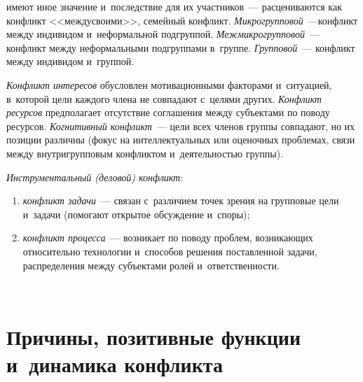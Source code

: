 \begin{multicols}{2}


\noindent
 имеют 
иное значение и~последствие для их участников~--- расцениваются как 
конфликт <<между\linebreak своими>>, семейный конфликт.  
\textit{Микрогрупповой}~---\linebreak конфликт между индивидом и~неформальной 
подгруппой. \textit{Меж\-мик\-ро\-груп\-по\-вой}~--- конфликт между неформальными 
подгруппами в~группе. \textit{Груп\-по\-вой}~--- конфликт между индивидом 
и~группой.
  
  \textit{Конфликт интересов} обусловлен мотивационными факторами 
и~ситуацией, в~которой цели каж\-до\-го члена не совпадают с~целями других. 
\textit{Конфликт ресурсов} предполагает отсутствие соглашения между 
субъектами по поводу ресурсов. \textit{Когнитивный конфликт}~--- цели всех 
членов группы совпадают, но их позиции различны (фокус на 
интеллектуальных или оценочных проблемах, связи между внутригрупповым 
конфликтом и~дея\-тель\-ностью группы).

\vspace*{5pt}
  
  \textit{Инструментальный (деловой) конфликт}:\\[-16pt]
\begin{enumerate}[(1)]
\item \textit{конфликт 
задачи}~--- связан с~различием точек зрения на групповые цели и~задачи 
(помогают открытое об\-суж\-де\-ние и~споры);\\[-14pt]
\item \textit{конфликт процесса}~--- 
возникает по поводу проблем, возникающих относительно технологии 
и~способов решения поставленной задачи, распределения между субъектами 
ролей и~от\-вет\-ст\-вен\-ности. 
\end{enumerate}

\begin{figure*}[b] %
\vspace*{1pt}
    \begin{center}  
  \mbox{%
 \epsfxsize=156.127mm 
 }
\end{center}
\vspace*{-9pt}
    \end{figure*}
  
\section{Причины, позитивные функции и~динамика конфликта} 
  

\end{multicols}
